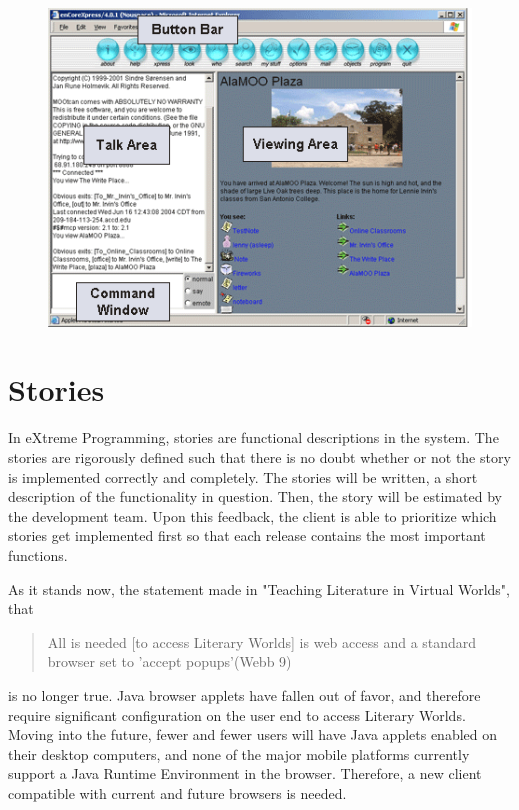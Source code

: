 \documentclass[12pt, letterpaper]{report}
\begin{document}
\par
\begin{figure}[ht!]
\centering
\includegraphics{enCoreScreen.png}
\label{overflow}
\end{figure}

%
\chapter{Stories}
\par
In eXtreme Programming, stories are functional descriptions in the system. The stories are rigorously defined such that there is no doubt whether or not the story is implemented correctly and completely. The stories will be written, a short description of the functionality in question. Then, the story will be estimated by the development team. Upon this feedback, the client is able to prioritize which stories get implemented first so that each release contains the most important functions.

\par
As it stands now, the statement made in "Teaching Literature in Virtual Worlds", that 

\begin{quotation}
All is needed [to access Literary Worlds] is web access and a standard browser set to 'accept popups'(Webb 9)
\end{quotation}
is no longer true. Java browser applets have fallen out of favor, and therefore require significant configuration on the user end to access Literary Worlds. Moving into the future, fewer and fewer users will have Java applets enabled on their desktop computers, and none of the major mobile platforms currently support a Java Runtime Environment in the browser. Therefore, a new client compatible with current and future browsers is needed.
\end{document}
